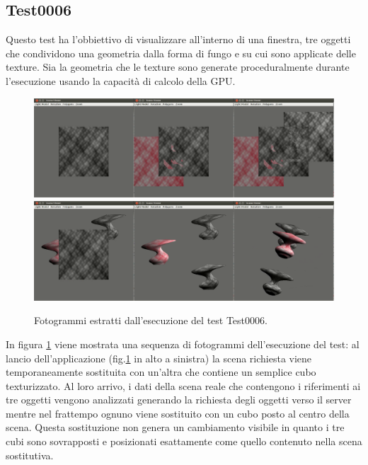\subsection{Test0006}
Questo test ha l'obbiettivo di visualizzare all'interno di una finestra, tre oggetti che condividono una geometria dalla forma di fungo e su cui sono applicate delle texture. Sia la geometria che le texture sono generate proceduralmente durante l'esecuzione usando la capacit\`a di calcolo della \ac{GPU}.
\begin{figure}%
\begin{center}
\includegraphics[width=\textwidth]{Immagini/test0006/test0006-wall1}
\includegraphics[width=\textwidth]{Immagini/test0006/test0006-wall2}
\caption{Fotogrammi estratti dall'esecuzione del test Test0006. \label{f:test0006-wall}} 
\end{center} 
\end{figure}
In figura \ref{f:test0006-wall} viene mostrata una sequenza di fotogrammi dell'esecuzione del test: al lancio dell'applicazione (fig.\ref{f:test0006-wall} in alto a sinistra) la scena richiesta viene temporaneamente sostituita con un'altra che contiene un semplice cubo texturizzato. 
Al loro arrivo, i dati della scena reale che contengono i riferimenti ai tre oggetti vengono analizzati generando la richiesta degli oggetti verso il server mentre nel frattempo ognuno viene sostituito con un cubo posto al centro della scena. Questa sostituzione non genera un cambiamento visibile in quanto i tre cubi sono sovrapposti e posizionati esattamente come quello contenuto nella scena sostitutiva.

